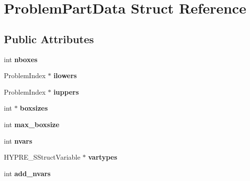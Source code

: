 \hypertarget{structProblemPartData}{}\section{Problem\+Part\+Data Struct Reference}
\label{structProblemPartData}
\subsection*{Public Attributes}
\begin{DoxyCompactItemize}
\item 
\hypertarget{structProblemPartData_a412a1a5f63f5ba6bdfd75daf4acf5c4e}{}int {\bfseries nboxes}\label{structProblemPartData_a412a1a5f63f5ba6bdfd75daf4acf5c4e}

\item 
\hypertarget{structProblemPartData_a69fdf6eb3de5a90b1d54fecc632f969b}{}Problem\+Index $\ast$ {\bfseries ilowers}\label{structProblemPartData_a69fdf6eb3de5a90b1d54fecc632f969b}

\item 
\hypertarget{structProblemPartData_a87ca1945edacc434275a5383b5ee6bdc}{}Problem\+Index $\ast$ {\bfseries iuppers}\label{structProblemPartData_a87ca1945edacc434275a5383b5ee6bdc}

\item 
\hypertarget{structProblemPartData_a2bef3b4215e527a98e6b7b94f2c2148f}{}int $\ast$ {\bfseries boxsizes}\label{structProblemPartData_a2bef3b4215e527a98e6b7b94f2c2148f}

\item 
\hypertarget{structProblemPartData_a8eab47ff0248505ee3b9cf9b192f69fe}{}int {\bfseries max\+\_\+boxsize}\label{structProblemPartData_a8eab47ff0248505ee3b9cf9b192f69fe}

\item 
\hypertarget{structProblemPartData_a58c4928d2a532e9add4655779b8a3b0f}{}int {\bfseries nvars}\label{structProblemPartData_a58c4928d2a532e9add4655779b8a3b0f}

\item 
\hypertarget{structProblemPartData_ade4b9f8370c937e8f6823324494fb1ec}{}H\+Y\+P\+R\+E\+\_\+\+S\+Struct\+Variable $\ast$ {\bfseries vartypes}\label{structProblemPartData_ade4b9f8370c937e8f6823324494fb1ec}

\item 
\hypertarget{structProblemPartData_a3a0d04ed2e9a2209160d1957351363c6}{}int {\bfseries add\+\_\+nvars}\label{structProblemPartData_a3a0d04ed2e9a2209160d1957351363c6}


\end{DoxyCompactItemize}
